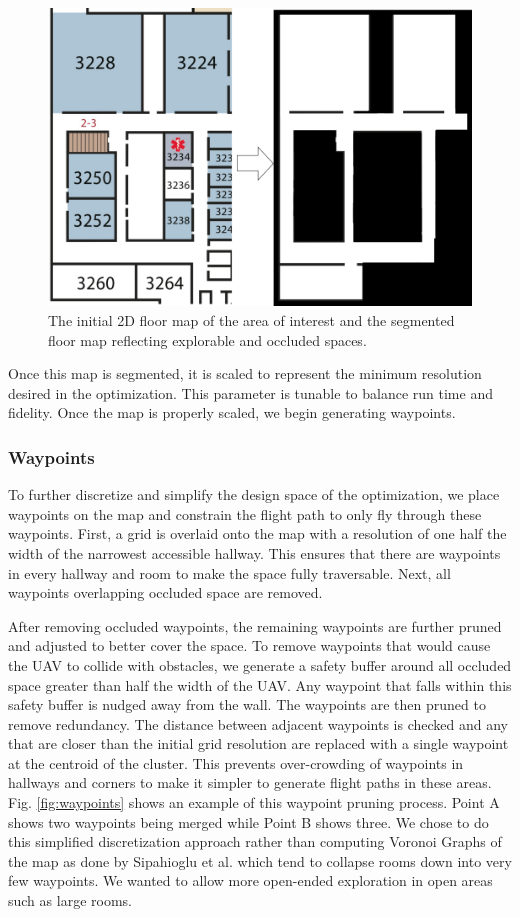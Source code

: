 \documentclass[letterpaper, 10 pt, conference]{ieeeconf}  %
\begin{document}
\begin{figure}
\centering
\includegraphics[width=0.8\linewidth]{figures/map_bw.png}
\caption{The initial 2D floor map of the area of interest and the segmented floor map reflecting explorable and occluded spaces.}
\label{fig:map_gen}
\end{figure}

Once this map is segmented, it is scaled to represent the minimum resolution desired in the optimization. This parameter is tunable to balance run time and fidelity. Once the map is properly scaled, we begin generating waypoints.

\subsubsection{Waypoints}

To further discretize and simplify the design space of the optimization, we place waypoints on the map and constrain the flight path to only fly through these waypoints. First, a grid is overlaid onto the map with a resolution of one half the width of the narrowest accessible hallway. This ensures that there are waypoints in every hallway and room to make the space fully traversable. Next, all waypoints overlapping occluded space are removed.

After removing occluded waypoints, the remaining waypoints are further pruned and adjusted to better cover the space. To remove waypoints that would cause the UAV to collide with obstacles, we generate a safety buffer around all occluded space greater than half the width of the UAV. Any waypoint that falls within this safety buffer is nudged away from the wall. The waypoints are then pruned to remove redundancy. The distance between adjacent waypoints is checked and any that are closer than the initial grid resolution are replaced with a single waypoint at the centroid of the cluster. This prevents over-crowding of waypoints in hallways and corners to make it simpler to generate flight paths in these areas. Fig. \ref{fig:waypoints} shows an example of this waypoint pruning process. Point A shows two waypoints being merged while Point B shows three. We chose to do this simplified discretization approach rather than computing Voronoi Graphs of the map as done by Sipahioglu et al. \cite{Sipahioglu2010} which tend to collapse rooms down into very few waypoints. We wanted to allow more open-ended exploration in open areas such as large rooms.
\end{document}
